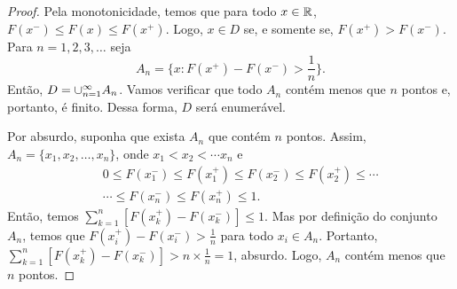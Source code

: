 %

\begin{frame}
\begin{proof}
Pela monotonicidade, temos que para todo $x\in\mathbb{R}$, $F(x^-)\leq F(x)\leq F(x^+)$. Logo, $x\in D$ se, e somente se, $F(x^+)>F(x^-)$. Para $n=1,2,3,\ldots$ seja
$$A_n=\{x:F(x^+)-F(x^-)>\frac{1}{n}\}.$$
Então, $D=\cup_{n=1}^{\infty}A_n$.
Vamos verificar que todo $A_n$ contém menos que $n$ pontos e, portanto, é finito. Dessa forma, $D$ será enumerável.

Por absurdo, suponha que exista $A_n$ que contém $n$ pontos. Assim, $A_n=\{x_1,x_2,\ldots,x_n\}$, onde $x_1<x_2<\cdots x_n$ e
\begin{eqnarray}
& & 0\leq F(x_1^-)\leq F(x_1^+)\leq F(x_2^-)\leq F(x_2^+)\leq \cdots \nonumber\\
& & \cdots \leq F(x_n^-)\leq F(x_n^+)\leq 1. \nonumber
\end{eqnarray}
Então, temos $\sum_{k=1}^{n}[F(x_k^+)-F(x_k^-)]\leq 1$.
Mas por definição do conjunto $A_n$, temos que $F(x_i^+)-F(x_i^-)>\frac{1}{n}$ para todo $x_i\in A_n$. Portanto,
$\sum_{k=1}^{n}[F(x_k^+)-F(x_k^-)]>n\times \frac{1}{n}= 1$, absurdo. Logo, $A_n$ contém menos que $n$ pontos.
\end{proof}
\end{frame}


